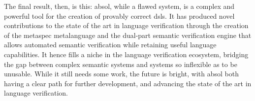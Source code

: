 The final result, then, is this: \gls{absol}, while a flawed system, is a complex and powerful tool for the creation of provably correct \glspl{dsl}. 
It has produced novel contributions to the state of the art in language verification through the creation of the \gls{metaspec} metalanguage and the dual-part semantic verification engine that allows automated semantic verification while retaining useful language capabilities.
It hence fills a niche in the language verification ecosystem, bridging the gap between complex semantic systems and systems so inflexible as to be unusable.
While it still needs some work, the future is bright, with \gls{absol} both having a clear path for further development, and advancing the state of the art in language verification. 

